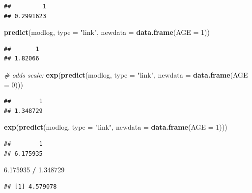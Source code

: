 \documentclass[
]{book}
\newenvironment{Shaded}{\begin{snugshade}}{\end{snugshade}}
\newcommand{\AttributeTok}[1]{\textcolor[rgb]{0.13,0.29,0.53}{#1}}
\newcommand{\CommentTok}[1]{\textcolor[rgb]{0.56,0.35,0.01}{\textit{#1}}}
\newcommand{\DecValTok}[1]{\textcolor[rgb]{0.00,0.00,0.81}{#1}}
\newcommand{\FloatTok}[1]{\textcolor[rgb]{0.00,0.00,0.81}{#1}}
\newcommand{\FunctionTok}[1]{\textcolor[rgb]{0.13,0.29,0.53}{\textbf{#1}}}
\newcommand{\NormalTok}[1]{#1}
\newcommand{\SpecialCharTok}[1]{\textcolor[rgb]{0.81,0.36,0.00}{\textbf{#1}}}
\newcommand{\StringTok}[1]{\textcolor[rgb]{0.31,0.60,0.02}{#1}}
\begin{document}
\begin{verbatim}
##         1 
## 0.2991623
\end{verbatim}

\begin{Shaded}
\begin{Highlighting}[]
\FunctionTok{predict}\NormalTok{(modlog, }\AttributeTok{type =} \StringTok{"link"}\NormalTok{,}
        \AttributeTok{newdata =} \FunctionTok{data.frame}\NormalTok{(}\AttributeTok{AGE =} \DecValTok{1}\NormalTok{))}
\end{Highlighting}
\end{Shaded}

\begin{verbatim}
##       1 
## 1.82066
\end{verbatim}

\begin{Shaded}
\begin{Highlighting}[]
\CommentTok{\# odds scale:}
\FunctionTok{exp}\NormalTok{(}\FunctionTok{predict}\NormalTok{(modlog, }\AttributeTok{type =} \StringTok{"link"}\NormalTok{,}
            \AttributeTok{newdata =} \FunctionTok{data.frame}\NormalTok{(}\AttributeTok{AGE =} \DecValTok{0}\NormalTok{)))}
\end{Highlighting}
\end{Shaded}

\begin{verbatim}
##        1 
## 1.348729
\end{verbatim}

\begin{Shaded}
\begin{Highlighting}[]
\FunctionTok{exp}\NormalTok{(}\FunctionTok{predict}\NormalTok{(modlog, }\AttributeTok{type =} \StringTok{"link"}\NormalTok{,}
            \AttributeTok{newdata =} \FunctionTok{data.frame}\NormalTok{(}\AttributeTok{AGE =} \DecValTok{1}\NormalTok{)))}
\end{Highlighting}
\end{Shaded}

\begin{verbatim}
##        1 
## 6.175935
\end{verbatim}

\begin{Shaded}
\begin{Highlighting}[]
\FloatTok{6.175935} \SpecialCharTok{/} \FloatTok{1.348729}
\end{Highlighting}
\end{Shaded}

\begin{verbatim}
## [1] 4.579078
\end{verbatim}
\end{document}
